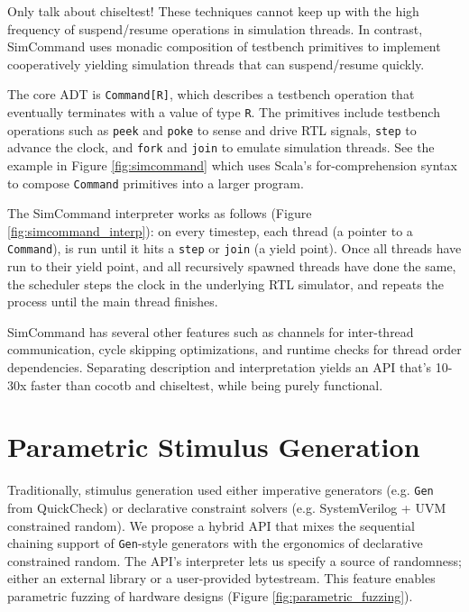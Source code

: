 \documentclass[sigplan,review,nonacm,9pt]{acmart}
\begin{document}
Only talk about chiseltest!
These techniques cannot keep up with the high frequency of suspend/resume operations in simulation threads.
In contrast, SimCommand uses monadic composition of testbench primitives\cite{hardcaml_step_testbench} to implement cooperatively yielding simulation threads that can suspend/resume quickly.

The core ADT is \texttt{Command[R]}, which describes a testbench operation that eventually terminates with a value of type \texttt{R}.
The primitives include testbench operations such as \texttt{peek} and \texttt{poke} to sense and drive RTL signals, \texttt{step} to advance the clock, and \texttt{fork} and \texttt{join} to emulate simulation threads.
See the example in Figure \ref{fig:simcommand} which uses Scala's for-comprehension syntax to compose \texttt{Command} primitives into a larger program.

The SimCommand interpreter works as follows (Figure \ref{fig:simcommand_interp}): on every timestep, each thread (a pointer to a \texttt{Command}), is run until it hits a \texttt{step} or \texttt{join} (a yield point).
Once all threads have run to their yield point, and all recursively spawned threads have done the same, the scheduler steps the clock in the underlying RTL simulator, and repeats the process until the main thread finishes.

SimCommand has several other features such as channels for inter-thread communication, cycle skipping optimizations, and runtime checks for thread order dependencies.
Separating description and interpretation yields an API that's 10-30x faster than cocotb and chiseltest, while being purely functional.


\section{Parametric Stimulus Generation}

Traditionally, stimulus generation used either imperative generators (e.g. \texttt{Gen} from QuickCheck\cite{quickcheck}) or declarative constraint solvers (e.g. SystemVerilog + UVM constrained random\cite{riscv_dv}).
We propose a hybrid API that mixes the sequential chaining support of \texttt{Gen}-style generators with the ergonomics of declarative constrained random.
The API's interpreter lets us specify a source of randomness; either an external library or a user-provided bytestream.
This feature enables parametric fuzzing\cite{zest} of hardware designs (Figure \ref{fig:parametric_fuzzing}).
\end{document}
